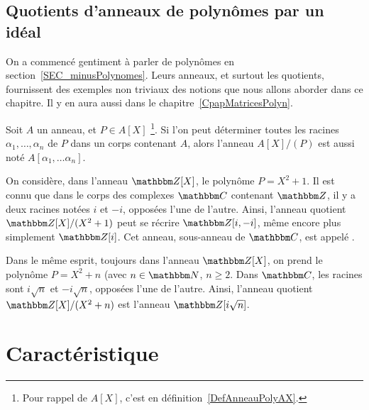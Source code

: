 \subsection{Quotients d'anneaux de polynômes par un idéal}
  On a commencé gentiment à parler de polynômes en section~\ref{SEC_minusPolynomes}. Leurs anneaux, et surtout les quotients, fournissent des exemples non triviaux des notions que nous allons aborder dans ce chapitre. Il y en aura aussi dans le chapitre~\ref{CpapMatricesPolyn}.

\begin{definition}\label{DEF_ExtensionAnneau}
  Soit \( A \) un anneau, et \( P \in A[X] \) \footnote{Pour rappel de \(A[X] \), c'est en définition~\ref{DefAnneauPolyAX}.}. Si l'on peut déterminer toutes les racines \( \alpha_1, \dots, \alpha_n \) de \( P \) dans un corps contenant \( A \), alors l'anneau \( A[X] / (P) \) est aussi noté \(A[\alpha_1,\dots \alpha_n]\).
\end{definition}

\begin{example}  \label{EX_ConstructionEntiersGauss}
  On considère, dans l'anneau \( \eZ[X] \), le polynôme \( P = X^2 + 1 \). Il est connu que dans le corps des complexes \( \eC \) contenant \( \eZ \), il y a deux racines notées \( i \) et \(-i \), opposées l'une de l'autre. Ainsi, l'anneau quotient \( \eZ[X]/(X^2 + 1) \) peut se récrire \( \eZ[i, -i] \), même encore plus simplement \( \eZ[i] \). Cet anneau, sous-anneau de \( \eC \), est appelé .
\end{example}

\begin{example}  \label{EX_ConstructionZisqrtn}
  Dans le même esprit, toujours dans l'anneau \( \eZ[X] \), on prend le polynôme \( P = X^2 + n \) (avec \( n \in \eN \), \( n \geq 2\). Dans \( \eC \), les racines sont \( i\sqrt n \) et \(-i \sqrt n\), opposées l'une de l'autre. Ainsi, l'anneau quotient \( \eZ[X]/(X^2 + n) \) est l'anneau \( \eZ[i \sqrt n] \).
\end{example}

\section{Caractéristique}

